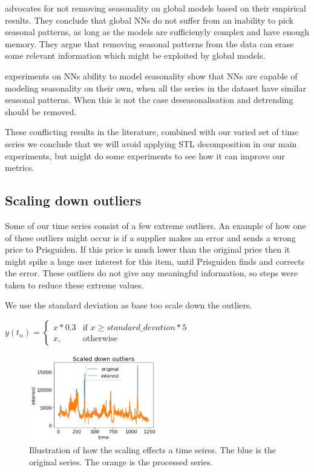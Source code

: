 \cite{Montero-Manso2021} advocates for not removing seasonality on global models based on their empirical results.
They conclude that global NNs do not suffer from an inability to pick seasonal patterns,
as long as the models are sufficienyly complex and have enough memory. They argue that removing
seasonal patterns from the data can erase some relevant information which might be exploited by global models.

\cite{Hewamalage2021} experiments on NNs ability to model seasonality show that NNs are capable of
modeling seasonality on their own, when all the series in the dataset have similar seasonal patterns.
When this is not the case deseasonalisation and detrending should be removed.

These conflicting results in the literature, combined with our varied set of time series
we conclude that we will avoid applying STL decomposition in our main experiments,
but might do some experiments to see how it can improve our metrics.



\subsection{Scaling down outliers}
\label{section:Data:Preprocessing:scale-down-outliers}
Some of our time series consist of a few extreme outliers. An example of
how one of these outliers might occur is if a supplier makes an error and sends
a wrong price to Prisguiden. If this price is much lower than the original price then
it might spike a huge user interest for this item, until Prisguiden finds and corrects the error.
These outliers do not give any meaningful information, so steps were taken to reduce these extreme values.

We use the standard deviation as base too scale down the outliers.

$y(t_n)=
  \begin{cases}
    x * 0.3 & \text{if } x\geq standard\_devation * 5 \\
    x,      & \text{otherwise}
  \end{cases}$



\begin{figure}[h!]
  \centering
  \includegraphics[width=0.5\textwidth]{./figs/code_generated/data_exploration/scaled_down_outliers.png}
  \hfill
  \caption{Illustration of how the scaling effects a time seires. The blue is the original series. The orange is the processed series.}
  \label{fig:illustration:scaled-down-outliers}
\end{figure}

